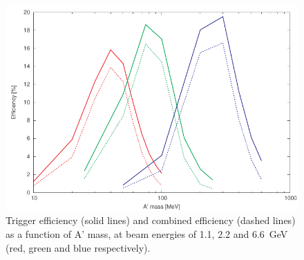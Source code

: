 \begin{figure}[ht]
	\includegraphics[width=\textwidth]{performance/trigger/ap_eff}
	\caption{\small{Trigger efficiency (solid lines) and combined efficiency (dashed lines) as a function of A' mass, at beam energies of 1.1, 2.2 and 6.6~GeV (red, green and blue respectively).}}
	\label{fig:trigeff}
\end{figure}

